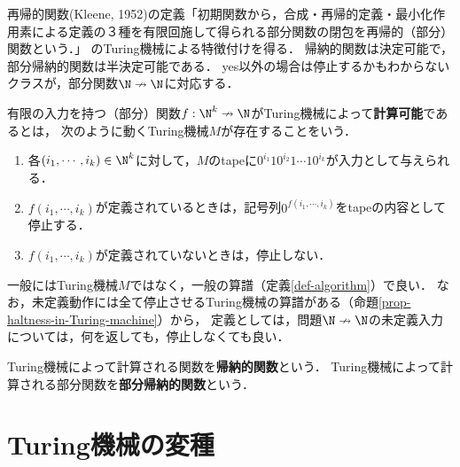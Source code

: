 \begin{tcolorbox}[colframe=ForestGreen, colback=ForestGreen!10!white, breakable]
    再帰的関数(Kleene, 1952)の定義「初期関数から，合成・再帰的定義・最小化作用素による定義の３種を有限回施して得られる部分関数の閉包を再帰的（部分）関数という．」
    のTuring機械による特徴付けを得る．
    帰納的関数は決定可能で，部分帰納的関数は半決定可能である．
    yes以外の場合は停止するかもわからないクラスが，部分関数$\N\nrightarrow\N$に対応する．
\end{tcolorbox}

\begin{definition}
    有限の入力を持つ（部分）関数$f:\N^k\nrightarrow\N$がTuring機械によって\textbf{計算可能}であるとは，
    次のように動くTuring機械$M$が存在することをいう．
    \begin{enumerate}
        \item 各$(i_1,\cdots,i_k)\in\N^k$に対して，$M$のtapeに$0^{i_1}10^{i_2}1\cdots 10^{i_k}$が入力として与えられる．
        \item $f(i_1,\cdots,i_k)$が定義されているときは，記号列$0^{f(i_1,\cdots,i_k)}$をtapeの内容として停止する．
        \item $f(i_1,\cdots,i_k)$が定義されていないときは，停止しない．
    \end{enumerate}
\end{definition}
\begin{remark}
    一般にはTuring機械$M$ではなく，一般の算譜（定義\ref{def-algorithm}）で良い．
    なお，未定義動作には全て停止させるTuring機械の算譜がある（命題\ref{prop-haltness-in-Turing-machine}）から，
    定義としては，問題$\N\nrightarrow\N$の未定義入力については，何を返しても，停止しなくても良い．
\end{remark}

\begin{definition}
    Turing機械によって計算される関数を\textbf{帰納的関数}という．
    Turing機械によって計算される部分関数を\textbf{部分帰納的関数}という．
\end{definition}

\section{Turing機械の変種}

